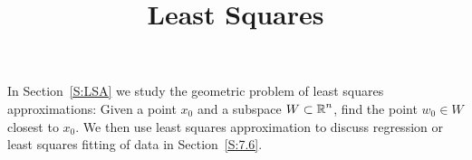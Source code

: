\documentclass{ximera}
\title{Least Squares}
\begin{document}
\begin{abstract}
\end{abstract}
\maketitle

\normalsize


In Section~\ref{S:LSA} we study the geometric problem of least squares approximations: 
Given a point $x_0$ and a subspace $W\subset\mbox{$\Bbb{R}$}^n$, find the point $w_0\in W$ 
closest to $x_0$.  We then use least squares approximation to discuss regression or 
least squares fitting of data in Section~\ref{S:7.6}.   
\end{document}
